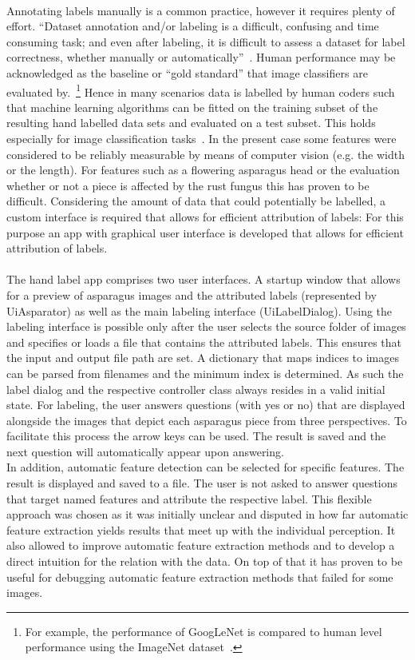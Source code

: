 \\
Annotating labels manually is a common practice, however it requires plenty of effort. “Dataset annotation and/or labeling is a difficult, confusing and time consuming task; and even after labeling, it is difficult to assess a dataset for label correctness, whether manually or automatically”~\citep{al2018labeling}. Human performance may be acknowledged as the baseline or “gold standard” that image classifiers are evaluated by.~\footnote{For example, the performance of GoogLeNet is compared to human level performance using the ImageNet dataset~\citep{russakovsky2015imagenet}.} Hence in many scenarios data is labelled by human coders such that machine learning algorithms can be fitted on the training subset of the resulting hand labelled data sets and evaluated on a test subset. This holds especially for image classification tasks~\citep{russakovsky2015imagenet}. In the present case some features were considered to be reliably measurable by means of computer vision (e.g. the width or the length). For features such as a flowering asparagus head or the evaluation whether or not a piece is affected by the rust fungus this has proven to be difficult. Considering the amount of data that could potentially be labelled, a custom interface is required that allows for efficient attribution of labels: For this purpose an app with graphical user interface is developed that allows for efficient attribution of labels. \\
\\
The hand label app comprises two user interfaces. A startup window that allows for a preview of asparagus images and the attributed labels (represented by Ui\textunderscore Asparator) as well as the main labeling interface (Ui\textunderscore LabelDialog). Using the labeling interface is possible only after the user selects the source folder of images and specifies or loads a file that contains the attributed labels. This ensures that the input and output file path are set. A dictionary that maps indices to images can be parsed from filenames and the minimum index is determined. As such the label dialog and the respective controller class always resides in a valid initial state. For labeling, the user answers questions (with yes or no) that are displayed alongside the images that depict each asparagus piece from three perspectives. To facilitate this process the arrow keys can be used. The result is saved and the next question will automatically appear upon answering. \\
In addition, automatic feature detection can be selected for specific features. The result is displayed and saved to a file. The user is not asked to answer questions that target named features and attribute the respective label. This flexible approach was chosen as it was initially unclear and disputed in how far automatic feature extraction yields results that meet up with the individual perception. It also allowed to improve automatic feature extraction methods and to develop a direct intuition for the relation with the data. On top of that it has proven to be useful for debugging automatic feature extraction methods that failed for some images. \\
